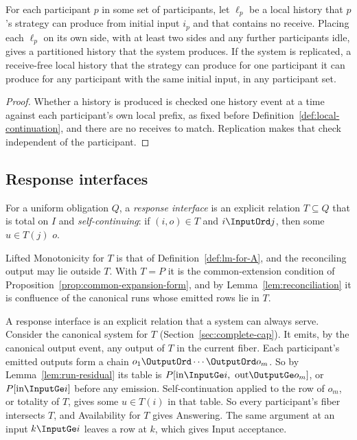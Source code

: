 \begin{lemma}[Locality]
\label{lem:locality}
For each participant $p$ in some set of participants, let $\ell_p$ be a local
history that $p$'s
strategy can produce from initial input $i_p$ and that contains no receive.
Placing each $\ell_p$ on its own side, with at least two sides and
any further participants
idle, gives a partitioned history that the system produces.  If the system is
replicated, a receive-free local history that the strategy can produce for one participant
it can produce for any participant with the same initial input, in any
participant set.
\end{lemma}

\begin{proof}
Whether a history is produced is checked one history event at a time against each
participant's own local prefix, as fixed before
Definition~\ref{def:local-continuation},
and there are no receives to match.
Replication makes that check independent of the participant.
\end{proof}

\subsection{Response interfaces}

\begin{definition}
\label{def:response-interface}
For a uniform obligation $Q$, a \emph{response interface} is an explicit
relation $T\subseteq Q$ that is total on $I$ and \emph{self-continuing}: if
$(i,o)\in T$ and $i\InputOrd j$, then some $u\in T(j)$ \outrel $o$.
\end{definition}

Lifted Monotonicity for $T$ is that of Definition~\ref{def:lm-for-A}, and
the reconciling output may lie outside $T$.  With $T=P$ it is the
common-extension condition of Proposition~\ref{prop:common-expansion-form}, and
by Lemma~\ref{lem:reconciliation} it is confluence of the canonical runs whose
emitted rows lie in $T$.

A response interface is an explicit relation that a system can always serve.
Consider the canonical system for $T$ (Section~\ref{sec:complete-cap}).  It
emits, by the canonical output event, any output of $T$ in the current fiber.
Each participant's emitted outputs form a chain
$o_1\OutputOrd\cdots\OutputOrd o_m$.  So by Lemma~\ref{lem:run-residual} its
table is $P[\mathrm{in}\InputGe i,\ \mathrm{out}\OutputGe o_m]$, or
$P[\mathrm{in}\InputGe i]$ before any emission.  Self-continuation applied to
the row of $o_m$, or totality of $T$, gives some $u\in T(i)$ in that table.
So every participant's fiber intersects $T$, and Availability for $T$ gives
Answering.  The same argument at an input $k\InputGe i$ leaves a row at $k$,
which gives Input acceptance.

